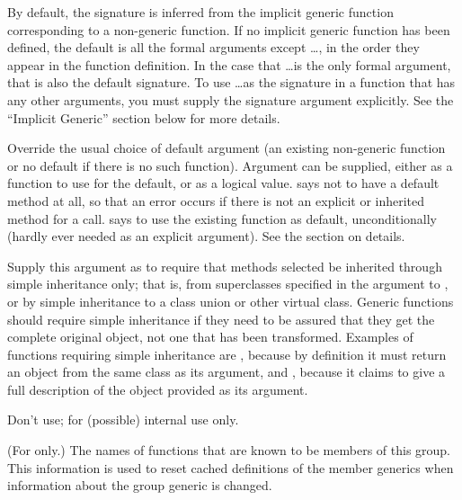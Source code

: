 \begin{Arguments}
\begin{ldescription}
By default, the signature is inferred from the implicit generic
function corresponding to a  non-generic function.  If no implicit generic function has been defined,  the default is all the
formal arguments except \dots, in the order they appear in the
function definition. In the case that
\dots is the only formal argument, that is also the default signature.  To use \dots as the signature
in a function that has any other arguments, you must supply the
signature argument explicitly.  See the ``Implicit
Generic'' section below for more details.

\item[\code{useAsDefault}] 
Override the usual choice of default argument (an existing
non-generic function or no default if there is no such function).
Argument  can be supplied,
either as a function to use for the default, or as a logical value.
 says not to have a default method at all, so that an
error occurs if there is not an explicit or inherited method for a
call.
 says to use the existing function as default,
unconditionally (hardly ever needed as an explicit argument).
See the section on details.

\item[\code{simpleInheritanceOnly}] 
Supply this argument as  to require that methods
selected be inherited through simple inheritance only; that is,
from superclasses specified in the  argument to
, or by simple inheritance to a class
union or other virtual class.  Generic functions should require
simple inheritance if they need to be assured that they get the
complete original object, not one that has been transformed.
Examples of functions requiring simple inheritance are
, because by definition it must return
an object from the same class as its argument, and
, because it claims to give a full description
of the object provided as its argument.

\item[\code{genericFunction}]  Don't use; for (possible) internal use only.


\item[\code{knownMembers}] 
(For  only.)  The names of functions that are
known to be members of this group.  This information is used to
reset cached definitions of the member generics when information
about the group generic is changed.

\end{ldescription}
\end{Arguments}
